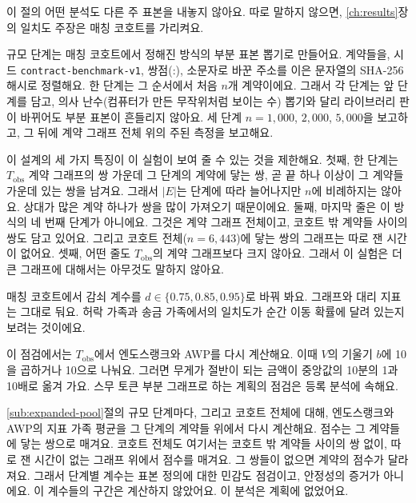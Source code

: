 
이 절의 어떤 분석도 다른 주 표본을 내놓지 않아요. 따로 말하지 않으면, \ref{ch:results}장의 일치도 주장은 매칭 코호트를 가리켜요.


규모 단계는 매칭 코호트에서 정해진 방식의 부분 표본 뽑기로 만들어요. 계약들을, 시드 \texttt{contract-benchmark-v1}, 쌍점(:), 소문자로 바꾼 주소를 이은 문자열의 SHA-256 해시로 정렬해요. 한 단계는 그 순서에서 처음 $n$개 계약이에요. 그래서 각 단계는 앞 단계를 담고, 의사 난수(컴퓨터가 만든 무작위처럼 보이는 수) 뽑기와 달리 라이브러리 판이 바뀌어도 부분 표본이 흔들리지 않아요. 세 단계 $n=1{,}000$, $2{,}000$, $5{,}000$을 보고하고, 그 뒤에 계약 그래프 전체 위의 주된 측정을 보고해요.

이 설계의 세 가지 특징이 이 실험이 보여 줄 수 있는 것을 제한해요. 첫째, 한 단계는 $T_{\mathrm{obs}}$ 계약 그래프의 쌍 가운데 그 단계의 계약에 닿는 쌍, 곧 끝 하나 이상이 그 계약들 가운데 있는 쌍을 남겨요. 그래서 $|E|$는 단계에 따라 늘어나지만 $n$에 비례하지는 않아요. 상대가 많은 계약 하나가 쌍을 많이 가져오기 때문이에요. 둘째, 마지막 줄은 이 방식의 네 번째 단계가 아니에요. 그것은 계약 그래프 전체이고, 코호트 밖 계약들 사이의 쌍도 담고 있어요. 그리고 코호트 전체($n=6{,}443$)에 닿는 쌍의 그래프는 따로 잰 시간이 없어요. 셋째, 어떤 줄도 $T_{\mathrm{obs}}$의 계약 그래프보다 크지 않아요. 그래서 이 실험은 더 큰 그래프에 대해서는 아무것도 말하지 않아요.


매칭 코호트에서 감쇠 계수를 $d\in\{0.75,0.85,0.95\}$로 바꿔 봐요. 그래프와 대리 지표는 그대로 둬요. 허락 가족과 송금 가족에서의 일치도가 순간 이동 확률에 달려 있는지 보려는 것이에요.


이 점검에서는 $T_{\mathrm{obs}}$에서 엔도스랭크와 AWP를 다시 계산해요. 이때 $V$의 기울기 $b$에 10을 곱하거나 10으로 나눠요. 그러면 무게가 절반이 되는 금액이 중앙값의 10분의 1과 10배로 옮겨 가요. 스무 토큰 부분 그래프로 하는 계획의 점검은 등록 분석에 속해요.


\ref{sub:expanded-pool}절의 규모 단계마다, 그리고 코호트 전체에 대해, 엔도스랭크와 AWP의 지표 가족 평균을 그 단계의 계약들 위에서 다시 계산해요. 점수는 그 계약들에 닿는 쌍으로 매겨요. 코호트 전체도 여기서는 코호트 밖 계약들 사이의 쌍 없이, 따로 잰 시간이 없는 그래프 위에서 점수를 매겨요. 그 쌍들이 없으면 계약의 점수가 달라져요. 그래서 단계별 계수는 표본 정의에 대한 민감도 점검이고, 안정성의 증거가 아니에요. 이 계수들의 구간은 계산하지 않았어요. 이 분석은 계획에 없었어요.

